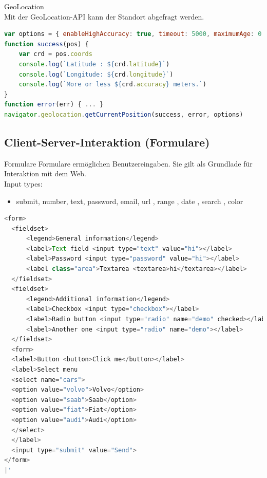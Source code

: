 GeoLocation\\
Mit der GeoLocation-API kann der Standort abgefragt werden.

\begin{lstlisting}[language=JavaScript, style=basesmol]
var options = { enableHighAccuracy: true, timeout: 5000, maximumAge: 0 }
function success(pos) {
    var crd = pos.coords
    console.log(`Latitude : ${crd.latitude}`)
    console.log(`Longitude: ${crd.longitude}`)
    console.log(`More or less ${crd.accuracy} meters.`)
}
function error(err) { ... }
navigator.geolocation.getCurrentPosition(success, error, options)
\end{lstlisting}

\subsection{Client-Server-Interaktion (Formulare)}

\begin{definition}{Formulare}
Formulare ermöglichen Benutzereingaben. Sie gilt als Grundlade für Interaktion mit dem Web.\\
Input types:

\begin{itemize}
\item submit, number, text, password, email, url , range , date , search , color
\end{itemize}
\end{definition}

\begin{lstlisting}[language=JavaScript, style=basesmol]
<form>
  <fieldset>
      <legend>General information</legend>
      <label>Text field <input type="text" value="hi"></label>
      <label>Password <input type="password" value="hi"></label>
      <label class="area">Textarea <textarea>hi</textarea></label>
  </fieldset>
  <fieldset>
      <legend>Additional information</legend>
      <label>Checkbox <input type="checkbox"></label>
      <label>Radio button <input type="radio" name="demo" checked></label>
      <label>Another one <input type="radio" name="demo"></label>
  </fieldset>
  <form>
  <label>Button <button>Click me</button></label>
  <label>Select menu
  <select name="cars">
  <option value="volvo">Volvo</option>
  <option value="saab">Saab</option>
  <option value="fiat">Fiat</option>
  <option value="audi">Audi</option>
  </select>
  </label>
  <input type="submit" value="Send">
</form>
|'
\end{lstlisting}




